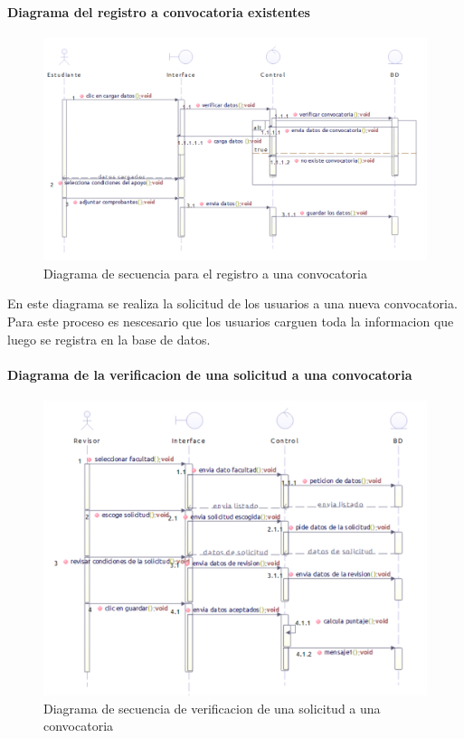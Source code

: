  
\paragraph{Diagrama del registro a convocatoria existentes}
\begin{figure}[H]
	\centering
	\includegraphics[width=0.8\linewidth]{parte2/imgs/DiagramaSecuencia/SecSolConv}
	\caption[Diagrama de secuencia Registro a una convocatoria]{Diagrama de secuencia para el registro a una convocatoria}
	\label{fig:diagramadesecuencia3}
\end{figure}

En este diagrama se realiza la solicitud de los usuarios a una nueva convocatoria. Para este proceso es nescesario que los usuarios carguen toda la informacion que luego se registra en la base de datos.


\paragraph{Diagrama de la verificacion de una solicitud a una convocatoria}
\begin{figure}[H]
	\centering
	\includegraphics[width=0.8\linewidth]{parte2/imgs/DiagramaSecuencia/SecVerifSolConv}
	\caption[Diagrama de secuencia Verificacion de solicitud]{Diagrama de secuencia de verificacion de una solicitud a una convocatoria}
	\label{fig:diagramadesecuencia4}
\end{figure}

